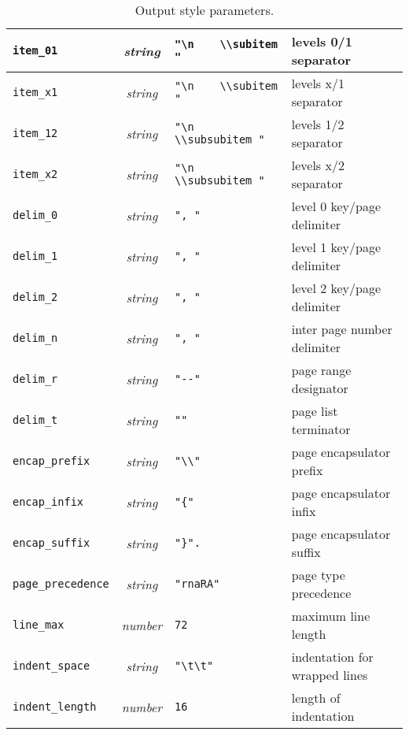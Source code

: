 \begin{table}
\begin{center}
{\begin{tabular}{l|c|l|l}
\hline
\verb|item_01| &  {\it string\/} & \verb|"\n    \\subitem "| &
levels 0/1 separator\\
\hline
\verb|item_x1| &  {\it string\/} & \verb|"\n    \\subitem "| &
levels x/1 separator\\
\hline
\verb|item_12| &  {\it string\/} & \verb|"\n      \\subsubitem "| &
levels 1/2 separator\\
\hline
\verb|item_x2| &  {\it string\/} & \verb|"\n      \\subsubitem "| &
levels x/2 separator\\
\hline
\verb|delim_0| &  {\it string\/} & \verb|", "| &
level 0 key/page delimiter\\
\hline
\verb|delim_1| &  {\it string\/} & \verb|", "| &
level 1 key/page delimiter\\
\hline
\verb|delim_2| &  {\it string\/} & \verb|", "| &
level 2 key/page delimiter\\
\hline
\verb|delim_n| &  {\it string\/} & \verb|", "| &
inter page number delimiter\\
\hline
\verb|delim_r| &  {\it string\/} & \verb|"--"| &
page range designator\\
\hline
\verb|delim_t| &  {\it string\/} & \verb|""| &
page list terminator \\
\hline
\verb|encap_prefix| &  {\it string\/} & \verb|"\\"| &
page encapsulator prefix\\
\hline
\verb|encap_infix| &  {\it string\/} & \verb|"{"| &
page encapsulator infix\\
\hline
\verb|encap_suffix| &  {\it string\/} & \verb|"}".| &
page encapsulator suffix\\
\hline
\verb|page_precedence| &  {\it string\/} & \verb|"rnaRA"| &
page type precedence\\
\hline
\verb|line_max| &  {\it number\/} & \verb|72| &
maximum line length\\
\hline
\verb|indent_space| &  {\it string\/} & \verb|"\t\t"| &
indentation for wrapped lines\\
\hline
\verb|indent_length| &  {\it number\/} & \verb|16| &
length of indentation\\
\hline
\end{tabular}
}
\end{center}
\caption{Output style parameters.}
\end{table}

